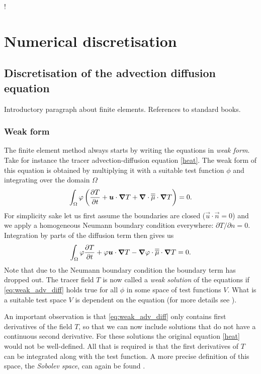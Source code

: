 !\chapter{Numerical discretisation}\label{chap:numerical_discretisation}

\section{Discretisation of the advection diffusion equation}
Introductory paragraph about finite elements. References to standard books.

\subsection{Weak form}
The finite element method always starts by writing the equations in 
\emph{weak form}. Take for instance the tracer advection-diffusion 
equation \eqref{heat}. 
The weak form of this equation is 
obtained by multiplying it with a suitable test 
function $\phi$ and integrating over the domain $\Omega$
\begin{equation*}
  \int_\Omega \varphi \left( \frac{\partial T}{\partial t} + {\mbox{\boldmath$u$}}\cdot{\mbox{\boldmath$\nabla$}} T + 
    {\mbox{\boldmath$\nabla$}}\cdot\overline{\overline{\mu}}\cdot{\mbox{\boldmath$\nabla$}}T\right) = 0.
\end{equation*}
For simplicity sake let us first assume the boundaries are closed ($\vec{u}\cdot\vec{n}=0$)
and we apply a homogeneous Neumann boundary condition everywhere: $\partial T/\partial n=0$.
Integration by parts of the diffusion term then gives us
\begin{equation}\label{eq:weak_adv_diff}
  \int_\Omega \varphi \frac{\partial T}{\partial t} + 
    \varphi{\mbox{\boldmath$u$}}\cdot{\mbox{\boldmath$\nabla$}} T -
    {\mbox{\boldmath$\nabla$}}\varphi\cdot \overline{\overline{\mu}}\cdot{\mbox{\boldmath$\nabla$}} T = 0. 
\end{equation}
Note that due to the Neumann boundary condition the boundary term has dropped out. The tracer 
field $T$ is now called a \emph{weak solution} of the equations if \eqref{eq:weak_adv_diff} holds true
for all $\phi$ in some space of test functions $V$. What is a suitable test space $V$ 
is dependent on the equation (for more details see \citet{elman08}). 

An important observation is that \eqref{eq:weak_adv_diff} only contains first derivatives 
of the field $T$, so that we can now include solutions that do not have a continuous 
second derivative. For these solutions the original equation \eqref{heat}
would not be well-defined. All that is required is that the first derivatives of $T$ can be 
integrated along with the test function. A more precise definition of this space, the 
\emph{Sobolev space}, can again be found \citet{elman08}.

